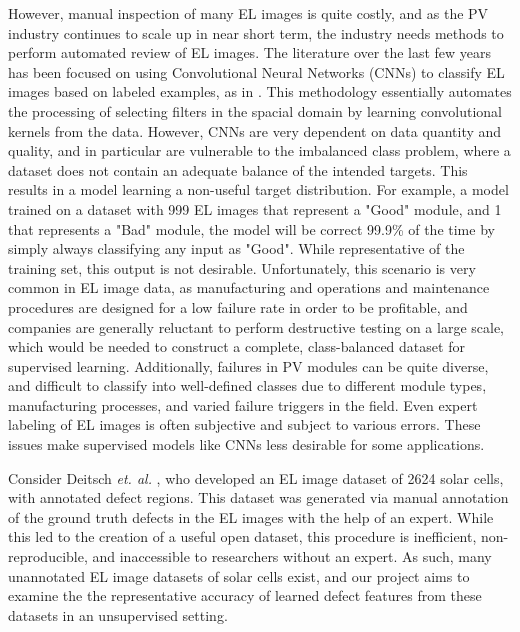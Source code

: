 \documentclass[conference]{IEEEtran}
\begin{document}
However, manual inspection of many EL images is quite costly, and as the PV industry continues to scale up in near short term, the industry needs methods to perform automated review of EL images. 
The literature over the last few years has been focused on using Convolutional Neural Networks (CNNs) to classify EL images based on labeled examples, as in \cite{akram_cnn_2019}. 
This methodology essentially automates the processing of selecting filters in the spacial domain by learning convolutional kernels from the data. 
However, CNNs are very dependent on data quantity and quality, and in particular are vulnerable to the imbalanced class problem, where a dataset does not contain an adequate balance of the intended targets. 
This results in a model learning a non-useful target distribution.
For example, a model trained on a dataset with 999 EL images that represent a "Good" module, and 1 that represents a "Bad" module, the model will be correct 99.9\% of the time by simply always classifying any input as "Good".
While representative of the training set, this output is not desirable. 
Unfortunately, this scenario is very common in EL image data, as manufacturing and operations and maintenance procedures are designed for a low failure rate in order to be profitable, and companies are generally reluctant to perform destructive testing on a large scale, which would be needed to construct a complete, class-balanced dataset for supervised learning. 
Additionally, failures in PV modules can be quite diverse, and difficult to classify into well-defined classes due to different module types, manufacturing processes, and varied failure triggers in the field. 
Even expert labeling of EL images is often subjective and subject to various errors. 
These issues make supervised models like CNNs less desirable for some applications. 

Consider Deitsch \textit{et. al.} \cite{deitsch_automatic_2019}, who developed an EL image dataset of 2624 solar cells, with annotated defect regions. 
This dataset was generated via manual annotation of the ground truth defects in the EL images with the help of an expert. 
While this led to the creation of a useful open dataset, this procedure is inefficient, non-reproducible, and inaccessible to researchers without an expert. 
As such, many unannotated EL image datasets of solar cells exist, and our project aims to examine the the representative accuracy of learned defect features from these datasets in an unsupervised setting.
\end{document}

